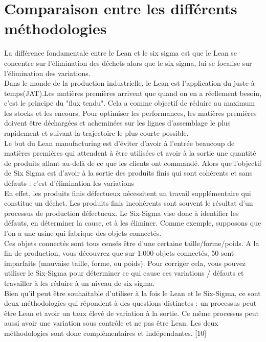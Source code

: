 \documentclass[12pt, a4paper]{thesis}
\begin{document}
\section{Comparaison entre les différents méthodologies }
La différence fondamentale entre le Lean et le six sigma est que le Lean se concentre sur l'élimination des déchets alors que le six sigma, lui se focalise sur l'élimination des variations.\\
Dans le monde de la production industrielle, le Lean est l'application du juste-à-temps(JAT).Les matières premières arrivent que quand on en a réellement besoin, c'est le principe du "flux tendu". Cela a comme objectif de réduire au maximum les stocks et les encours. Pour optimiser les performances, les matières premières doivent être déchargées et acheminées sur les lignes d'assemblage le plus rapidement et suivant la trajectoire le plus courte possible.\\
Le but du Lean manufacturing est d'éviter d'avoir à l'entrée beaucoup de matières premières qui attendent à être utilisées et avoir à la sortie une quantité de produits allant au-delà de ce que les clients ont commandé.
Alors que l'objectif de Six Sigma est d'avoir à la sortie des produits finis qui sont cohérents et sans défauts : c'est d'élimination les variations \\  En effet, les produits finis défectueux nécessitent un travail supplémentaire qui constitue un déchet. Les produits finis incohérents sont souvent le résultat d'un processus de production défectueux. Le Six-Sigma vise donc à identifier les défauts, en déterminer la cause, et à les éliminer. Comme exemple, supposons que l'on a une usine qui fabrique des objets connectés.\\
Ces objets connectés sont tous censés être d'une certaine taille/forme/poids. A la fin de production, vous découvrez que sur 1.000 objets connectés, 50 sont imparfaits (mauvaise taille, forme, ou poids). Pour corriger cela, vous pouvez utiliser le Six-Sigma pour déterminer ce qui cause ces variations / défauts et travailler à les réduire à un niveau de six sigma.\\
Bien qu'il peut être souhaitable d'utiliser à la fois le Lean et le Six-Sigma, ce sont deux méthodologies qui répondent à des questions distinctes : un processus peut être Lean et avoir un taux élevé de variation à la sortie. Ce même processus peut aussi avoir une variation sous contrôle et ne pas être Lean. Les deux méthodologies sont donc complémentaires et indépendantes. [10] \\ 
\end{document}

